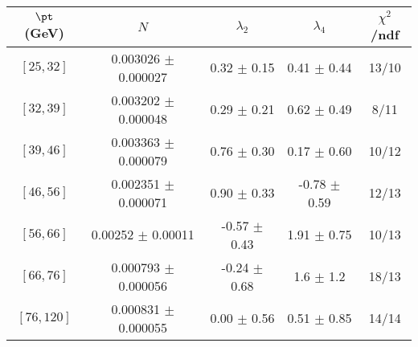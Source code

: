 \begin{tabular}{c||c|c|c|c}
$\pt$ (GeV) & $N$ & $\lambda_{2}$ & $\lambda_4$  & $\chi^2$/ndf  \\
\hline
$[25, 32]$ & 0.003026 $\pm$ 0.000027 & 0.32 $\pm$ 0.15 & 0.41 $\pm$ 0.44 & 13/10\\
$[32, 39]$ & 0.003202 $\pm$ 0.000048 & 0.29 $\pm$ 0.21 & 0.62 $\pm$ 0.49 & 8/11\\
$[39, 46]$ & 0.003363 $\pm$ 0.000079 & 0.76 $\pm$ 0.30 & 0.17 $\pm$ 0.60 & 10/12\\
$[46, 56]$ & 0.002351 $\pm$ 0.000071 & 0.90 $\pm$ 0.33 & -0.78 $\pm$ 0.59 & 12/13\\
$[56, 66]$ & 0.00252 $\pm$ 0.00011 & -0.57 $\pm$ 0.43 & 1.91 $\pm$ 0.75 & 10/13\\
$[66, 76]$ & 0.000793 $\pm$ 0.000056 & -0.24 $\pm$ 0.68 & 1.6 $\pm$ 1.2 & 18/13\\
$[76, 120]$ & 0.000831 $\pm$ 0.000055 & 0.00 $\pm$ 0.56 & 0.51 $\pm$ 0.85 & 14/14\\
\end{tabular}
